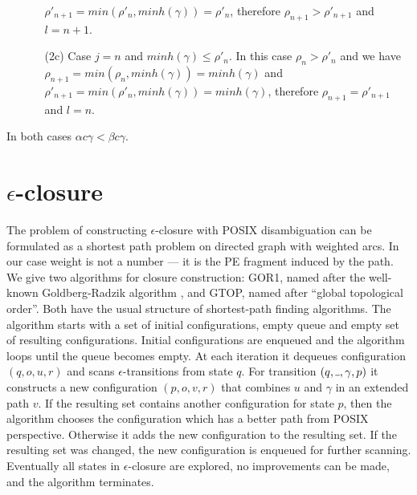 \documentclass[AMA,STIX1COL]{WileyNJD-v2}
\newcommand{\Xund}{\rule{.4em}{.4pt}}
\begin{document}
\begin{proofEnd}
\begin{itemize}[itemsep=0.5em, topsep=0.5em]
\begin{itemize}
            $\rho'_{n+1} = min(\rho'_n, minh(\gamma)) = \rho'_n$,
            therefore $\rho_{n+1} > \rho'_{n+1}$
            and $l = n + 1$.
        \item[(2c)]
            Case $j = n$ and $minh(\gamma) \leq \rho'_n$.
            In this case $\rho_n > \rho'_n$ and we have
            $\rho_{n+1} = min(\rho_n, minh(\gamma)) = minh(\gamma)$ and
            $\rho'_{n+1} = min(\rho'_n, minh(\gamma)) = minh(\gamma)$,
            therefore $\rho_{n+1} = \rho'_{n+1}$
            and $l = n$.
        \end{itemize}
    \end{itemize}
    In both cases $\alpha c \gamma < \beta c \gamma$.
\end{proofEnd}


\section{$\epsilon$-closure}\label{section_closure}

The problem of constructing $\epsilon$-closure with POSIX disambiguation
can be formulated as a shortest path problem on directed graph with weighted arcs.
In our case weight is not a number --- it is the PE fragment induced by the path.
%
We give two algorithms for closure construction: GOR1, named after the well-known Goldberg-Radzik algorithm \cite{GR93},
and GTOP, named after ``global topological order''.
%
Both have the usual structure of shortest-path finding algorithms.
The algorithm starts with a set of initial configurations, empty queue and empty set of resulting configurations.
Initial configurations are enqueued and the algorithm loops until the queue becomes empty.
At each iteration it dequeues configuration $(q, o, u, r)$ and scans $\epsilon$-transitions from state $q$.
For transition $(q, \Xund, \gamma, p)$ it constructs a new configuration $(p, o, v, r)$
that combines $u$ and $\gamma$ in an extended path $v$.
If the resulting set contains another configuration for state $p$,
then the algorithm chooses the configuration which has a better path from POSIX perspective.
Otherwise it adds the new configuration to the resulting set.
If the resulting set was changed, the new configuration is enqueued for further scanning.
Eventually all states in $\epsilon$-closure are explored, no improvements can be made, and the algorithm terminates.
%
\\
\end{document}
